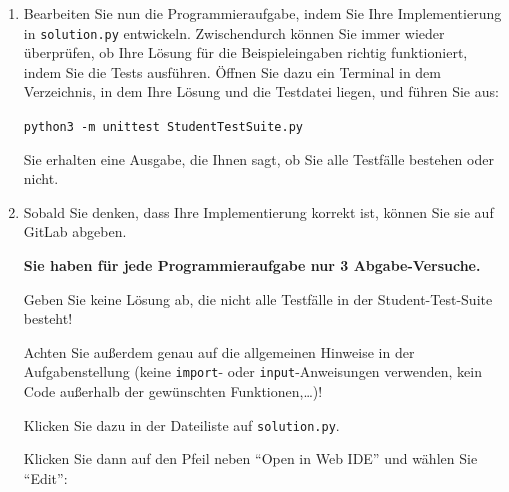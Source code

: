 \documentclass{scrartcl}
\begin{document}
\begin{enumerate}
%		
		
		\vfill
		
		\item Bearbeiten Sie nun die Programmieraufgabe, indem Sie Ihre Implementierung in \texttt{solution.py} entwickeln. Zwischendurch können Sie immer wieder überprüfen, ob Ihre Lösung für die Beispieleingaben richtig funktioniert, indem Sie die Tests ausführen. Öffnen Sie dazu ein Terminal in dem Verzeichnis, in dem Ihre Lösung und die Testdatei liegen, und führen Sie aus:
		
		\vfill
		
		\texttt{python3 -m unittest StudentTestSuite.py}
		
		\vfill
		
		Sie erhalten eine Ausgabe, die Ihnen sagt, ob Sie alle Testfälle bestehen oder nicht.
		
		\vfill
		
		\item Sobald Sie denken, dass Ihre Implementierung korrekt ist, können Sie sie auf GitLab abgeben.
		
		\vfill
		
		\begin{tcolorbox}[title=\faExclamationCircle\space Achtung,colbacktitle=red!75,colframe=red!75]
			\bfseries Sie haben für jede Programmieraufgabe nur 3 Abgabe-Versuche.
			
			Geben Sie keine Lösung ab, die nicht alle Testfälle in der Student-Test-Suite besteht!
			
			Achten Sie außerdem genau auf die allgemeinen Hinweise in der Aufgabenstellung (keine \texttt{import}- oder \texttt{input}-Anweisungen verwenden, kein Code außerhalb der gewünschten Funktionen,\ldots)!
		\end{tcolorbox}
	
		\vfill
	
		Klicken Sie dazu in der Dateiliste auf \texttt{solution.py}. 
		
		Klicken Sie dann auf den Pfeil neben \enquote{Open in Web IDE} und wählen Sie \enquote{Edit}:
		
		\vfill
		

\end{enumerate}
\end{document}
